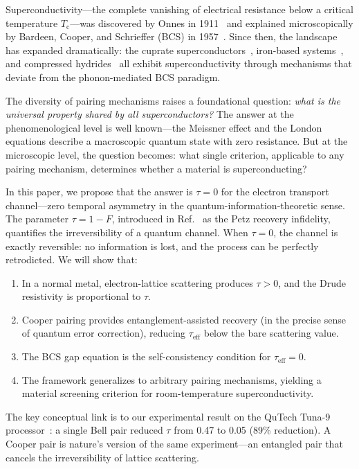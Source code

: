 \documentclass[prb,twocolumn,superscriptaddress,longbibliography,floatfix]{revtex4-2}
\newcommand{\tauasym}{\tau}
\newcommand{\taueff}{\tauasym_{\mathrm{eff}}}
\newcommand{\Tc}{T_{\mathrm{c}}}
\begin{document}
Superconductivity---the complete vanishing of electrical resistance
below a critical temperature $\Tc$---was discovered by Onnes in
1911~\cite{Onnes1911} and explained microscopically by Bardeen,
Cooper, and Schrieffer (BCS) in 1957~\cite{BCS1957}.  Since then,
the landscape has expanded dramatically: the cuprate
superconductors~\cite{Bednorz1986}, iron-based
systems~\cite{Kamihara2008}, and compressed
hydrides~\cite{Drozdov2015,Somayazulu2019} all exhibit
superconductivity through mechanisms that deviate from the
phonon-mediated BCS paradigm.

The diversity of pairing mechanisms raises a foundational question:
\emph{what is the universal property shared by all superconductors?}
The answer at the phenomenological level is well known---the Meissner
effect and the London equations describe a macroscopic quantum state
with zero resistance.  But at the microscopic level, the question
becomes: what single criterion, applicable to any pairing mechanism,
determines whether a material is superconducting?

In this paper, we propose that the answer is $\tauasym = 0$ for the
electron transport channel---zero temporal asymmetry in the
quantum-information-theoretic sense.  The parameter $\tauasym = 1 - F$,
introduced in Ref.~\cite{Huang2026} as the Petz recovery infidelity,
quantifies the irreversibility of a quantum channel.  When $\tauasym = 0$,
the channel is exactly reversible: no information is lost, and the
process can be perfectly retrodicted.  We will show that:

\begin{enumerate}
\item In a normal metal, electron-lattice scattering produces
  $\tauasym > 0$, and the Drude resistivity is proportional to
  $\tauasym$.
\item Cooper pairing provides entanglement-assisted recovery
  (in the precise sense of quantum error correction), reducing
  $\taueff$ below the bare scattering value.
\item The BCS gap equation is the self-consistency condition for
  $\taueff = 0$.
\item The framework generalizes to arbitrary pairing mechanisms,
  yielding a material screening criterion for room-temperature
  superconductivity.
\end{enumerate}

The key conceptual link is to our experimental result on the QuTech
Tuna-9 processor~\cite{Huang2026exp}: a single Bell pair reduced
$\tauasym$ from 0.47 to 0.05 (89\% reduction).  A Cooper pair is
nature's version of the same experiment---an entangled pair that
cancels the irreversibility of lattice scattering.
\end{document}
